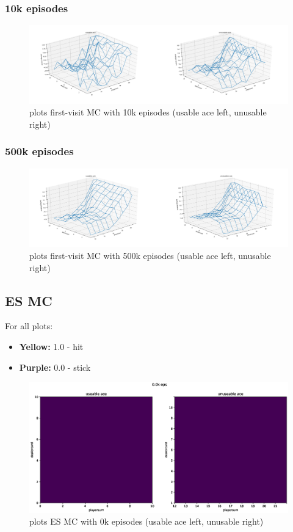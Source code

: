 \documentclass[11pt,a4paper]{article}
\begin{document}
\subsubsection{10k episodes}

\begin{figure}[h!]
  \includegraphics[width=.7\textwidth]{10k_eps.png}
  \centering
  \caption{plots first-visit MC with 10k episodes (usable ace left, unusable right)}
  \label{fig1}
\end{figure}

\subsubsection{500k episodes}

\begin{figure}[h!]
  \includegraphics[width=.7\textwidth]{500k_eps.png}
  \centering
  \caption{plots first-visit MC with 500k episodes (usable ace left, unusable right)}
  \label{fig2}
\end{figure}

\subsection{ES MC}

For all plots:
\begin{itemize}
  \item \textbf{Yellow:} 1.0 - hit
  \item \textbf{Purple:} 0.0 - stick
\end{itemize}


\begin{figure}[h!]
  \includegraphics[width=.7\textwidth]{0k.eps}
  \centering
  \caption{plots ES MC with 0k episodes (usable ace left, unusable right)}
  \label{fig3}
\end{figure}
\end{document}
